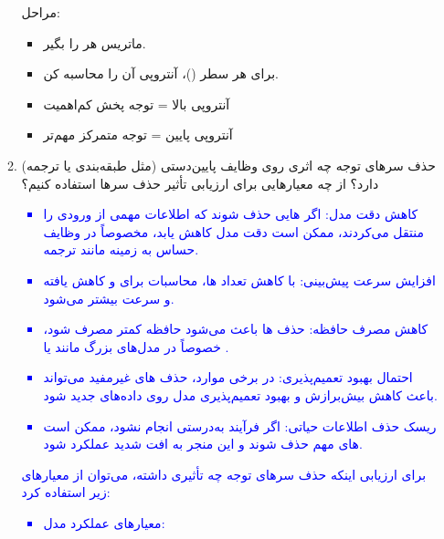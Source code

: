 \documentclass[12pt]{article}
\begin{document}
\begin{enumerate}
\begin{enumerate}
{\begin{itemize}
                مراحل:
                \begin{itemize}
                    \item ماتریس  هر  را بگیر.
                    \item برای هر سطر ()، آنتروپی آن را محاسبه کن.
                    \item آنتروپی بالا = توجه پخش   کم‌اهمیت
                    \item آنتروپی پایین = توجه متمرکز   مهم‌تر
                \end{itemize}
            \end{itemize}
            }
            \item 	حذف سرهای توجه چه اثری روی وظایف پایین‌دستی (مثل طبقه‌بندی یا ترجمه) دارد؟ از چه معیارهایی برای ارزیابی تأثیر حذف سرها استفاده کنیم؟
            \textcolor{blue}{
            \begin{itemize}
                \item کاهش دقت مدل:
                اگر  هایی حذف شوند که اطلاعات مهمی از ورودی را منتقل می‌کردند، ممکن است دقت مدل کاهش یابد، مخصوصاً در وظایف حساس به زمینه مانند ترجمه.
                \item افزایش سرعت پیش‌بینی:
                با کاهش تعداد  ها، محاسبات  برای   و  کاهش یافته و سرعت  بیشتر می‌شود.
                \item کاهش مصرف حافظه:
                حذف  ها باعث می‌شود حافظه  کمتر مصرف شود، خصوصاً در مدل‌های بزرگ مانند  یا .
                \item احتمال بهبود تعمیم‌پذیری:
                در برخی موارد، حذف  های غیرمفید می‌تواند باعث  کاهش بیش‌برازش و بهبود تعمیم‌پذیری مدل روی داده‌های جدید شود.
                \item ریسک حذف اطلاعات حیاتی:
                اگر فرآیند  به‌درستی انجام نشود، ممکن است  های مهم حذف شوند و این منجر به افت شدید   عملکرد شود.
            \end{itemize}
            برای ارزیابی اینکه حذف سرهای توجه چه تأثیری داشته، می‌توان از معیارهای زیر استفاده کرد:
            \begin{itemize}
                \item معیارهای عملکرد مدل:

\end{itemize}}
\end{enumerate}
\end{enumerate}
\end{document}
